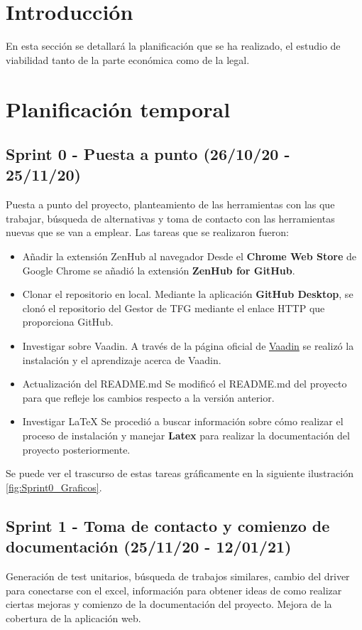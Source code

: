 
\section{Introducción}
En esta sección se detallará la planificación que se ha realizado, el estudio de viabilidad tanto de la parte económica como de la legal.

\section{Planificación temporal}
\subsection{Sprint 0 - Puesta a punto (26/10/20 - 25/11/20)}
Puesta a punto del proyecto, planteamiento de las herramientas con las que trabajar, búsqueda de alternativas y toma de contacto con las herramientas nuevas que se van a emplear.
Las tareas que se realizaron fueron:
\begin{itemize}
	\tightlist
	\item Añadir la extensión ZenHub al navegador
		Desde el \textbf{Chrome Web Store} de Google Chrome se añadió la extensión \textbf{ZenHub for GitHub}.
	\item Clonar el repositorio en local. 
		Mediante la aplicación \textbf{GitHub Desktop}, se clonó el repositorio del Gestor de TFG mediante el enlace HTTP que proporciona GitHub.
	\item Investigar sobre Vaadin.
		A través de la página oficial de \href{https://vaadin.com/}{Vaadin} se realizó la instalación y el aprendizaje acerca de Vaadin.
	\item Actualización del README.md 
		Se modificó el README.md del proyecto para que refleje los cambios respecto a la versión anterior. 
	\item Investigar LaTeX
		Se procedió a buscar información sobre cómo realizar el proceso de instalación y manejar \textbf{Latex} para realizar la documentación del proyecto posteriormente.
\end{itemize}

Se puede ver el trascurso de estas tareas gráficamente en la siguiente ilustración \ref{fig:Sprint0_Graficos}.



\subsection{Sprint 1 - Toma de contacto y comienzo de documentación (25/11/20 - 12/01/21)}
Generación de test unitarios, búsqueda de trabajos similares, cambio del driver para conectarse con el excel, información para obtener ideas de como realizar ciertas mejoras y comienzo de la documentación del proyecto. Mejora de la cobertura de la aplicación web.

